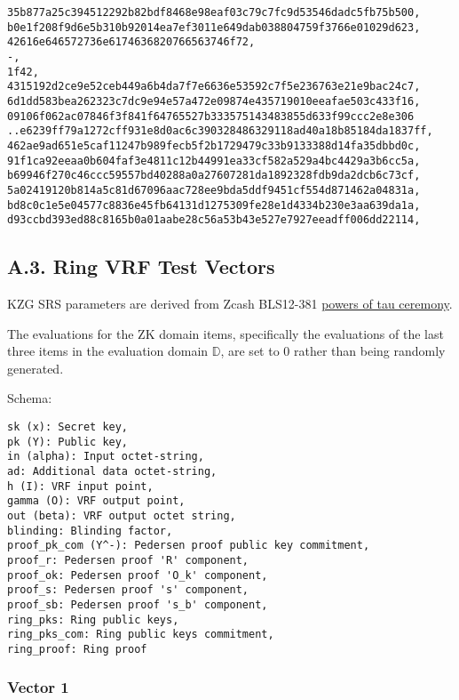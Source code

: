 \documentclass[
]{article}
\begin{document}
\begin{verbatim}
35b877a25c394512292b82bdf8468e98eaf03c79c7fc9d53546dadc5fb75b500,
b0e1f208f9d6e5b310b92014ea7ef3011e649dab038804759f3766e01029d623,
42616e646572736e6174636820766563746f72,
-,
1f42,
4315192d2ce9e52ceb449a6b4da7f7e6636e53592c7f5e236763e21e9bac24c7,
6d1dd583bea262323c7dc9e94e57a472e09874e435719010eeafae503c433f16,
09106f062ac07846f3f841f64765527b333575143483855d633f99ccc2e8e306
..e6239ff79a1272cff931e8d0ac6c390328486329118ad40a18b85184da1837ff,
462ae9ad651e5caf11247b989fecb5f2b1729479c33b9133388d14fa35dbbd0c,
91f1ca92eeaa0b604faf3e4811c12b44991ea33cf582a529a4bc4429a3b6cc5a,
b69946f270c46ccc59557bd40288a0a27607281da1892328fdb9da2dcb6c73cf,
5a02419120b814a5c81d67096aac728ee9bda5ddf9451cf554d871462a04831a,
bd8c0c1e5e04577c8836e45fb64131d1275309fe28e1d4334b230e3aa639da1a,
d93ccbd393ed88c8165b0a01aabe28c56a53b43e527e7927eeadff006dd22114,
\end{verbatim}

\subsection{A.3. Ring VRF Test
Vectors}\label{a.3.-ring-vrf-test-vectors}

KZG SRS parameters are derived from Zcash BLS12-381
\href{https://zfnd.org/conclusion-of-the-powers-of-tau-ceremony}{powers
of tau ceremony}.

The evaluations for the ZK domain items, specifically the evaluations of
the last three items in the evaluation domain \(\mathbb{D}\), are set to
0 rather than being randomly generated.

Schema:

\begin{verbatim}
sk (x): Secret key,
pk (Y): Public key,
in (alpha): Input octet-string,
ad: Additional data octet-string,
h (I): VRF input point,
gamma (O): VRF output point,
out (beta): VRF output octet string,
blinding: Blinding factor,
proof_pk_com (Y^-): Pedersen proof public key commitment,
proof_r: Pedersen proof 'R' component,
proof_ok: Pedersen proof 'O_k' component,
proof_s: Pedersen proof 's' component,
proof_sb: Pedersen proof 's_b' component,
ring_pks: Ring public keys,
ring_pks_com: Ring public keys commitment,
ring_proof: Ring proof
\end{verbatim}

\subsubsection{Vector 1}\label{vector-1-2}
\end{document}

